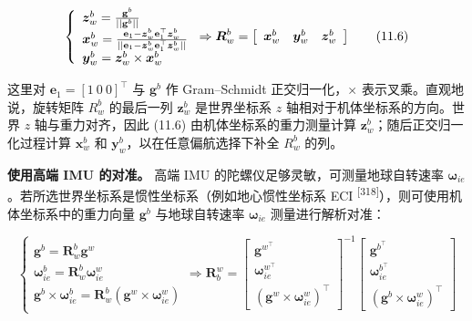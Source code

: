 \begin{equation}
\left\{ \begin{array}{l} \boldsymbol {z} _ {w} ^ {b} = \frac {\mathbf {g} ^ {b}}{| | \mathbf {g} ^ {b} | |} \\ \boldsymbol {x} _ {w} ^ {b} = \frac {\mathbf {e} _ {1} - \boldsymbol {z} _ {w} ^ {b} \mathbf {e} _ {1} ^ {\top} \boldsymbol {z} _ {w} ^ {b}}{| | \mathbf {e} _ {1} - \boldsymbol {z} _ {w} ^ {b} \mathbf {e} _ {1} ^ {\top} \boldsymbol {z} _ {w} ^ {b} | |} \\ \boldsymbol {y} _ {w} ^ {b} = \boldsymbol {z} _ {w} ^ {b} \times \boldsymbol {x} _ {w} ^ {b} \end{array} \right. \Rightarrow \boldsymbol {R} _ {w} ^ {b} = \left[ \begin{array}{c c c} \boldsymbol {x} _ {w} ^ {b} & \boldsymbol {y} _ {w} ^ {b} & \boldsymbol {z} _ {w} ^ {b} \end{array} \right]\tag{11.6}
\end{equation}

这里对 $\mathbf e_1=[1\ 0\ 0]^\top$ 与 $\mathbf g^b$ 作 Gram--Schmidt 正交归一化，$\times$ 表示叉乘。直观地说，旋转矩阵 $R_w^b$ 的最后一列 $\boldsymbol z_w^b$ 是世界坐标系 $z$ 轴相对于机体坐标系的方向。世界 $z$ 轴与重力对齐，因此 (11.6) 由机体坐标系的重力测量计算 $\boldsymbol z_w^b$；随后正交归一化过程计算 $\boldsymbol x_w^b$ 和 $\boldsymbol y_w^b$，以在任意偏航选择下补全 $R_w^b$ 的列。

\textbf{使用高端 IMU 的对准。} 高端 IMU 的陀螺仪足够灵敏，可测量地球自转速率 $\boldsymbol\omega_{ie}$。若所选世界坐标系是惯性坐标系（例如地心惯性坐标系 ECI \textsuperscript{[318]}），则可使用机体坐标系中的重力向量 $\mathbf g^b$ 与地球自转速率 $\boldsymbol\omega_{ie}$ 测量进行解析对准：

\begin{equation}
\left\{ \begin{array}{l} \mathbf {g} ^ {b} = \boldsymbol {R} _ {w} ^ {b} \mathbf {g} ^ {w} \\ \boldsymbol {\omega} _ {i e} ^ {b} = \boldsymbol {R} _ {w} ^ {b} \boldsymbol {\omega} _ {i e} ^ {w} \\ \mathbf {g} ^ {b} \times \boldsymbol {\omega} _ {i e} ^ {b} = \boldsymbol {R} _ {w} ^ {b} \left(\mathbf {g} ^ {w} \times \boldsymbol {\omega} _ {i e} ^ {w}\right) \end{array} \Rightarrow \boldsymbol {R} _ {b} ^ {w} = \left[ \begin{array}{c} \mathbf {g} ^ {w ^ {\top}} \\ \boldsymbol {\omega} _ {i e} ^ {w ^ {\top}} \\ (\mathbf {g} ^ {w} \times \boldsymbol {\omega} _ {i e} ^ {w}) ^ {\top} \end{array} \right] ^ {- 1} \left[ \begin{array}{c} \mathbf {g} ^ {b ^ {\top}} \\ \boldsymbol {\omega} _ {i e} ^ {b ^ {\top}} \\ (\mathbf {g} ^ {b} \times \boldsymbol {\omega} _ {i e} ^ {w}) ^ {\top} \end{array} \right] \right.\tag{11.7}
\end{equation}

